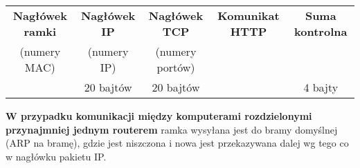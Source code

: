 \documentclass[../main.tex]{subfiles}
\begin{document}
\begin{adjustbox}{width=\columnwidth,center}
    \begin{tabular}{|c|c|c|c|c|}
        \hline
        \textbf{Nagłówek ramki }& \textbf{Nagłówek IP }& \textbf{Nagłówek TCP }& \textbf{Komunikat HTTP }& \textbf{Suma kontrolna}\\
        (numery MAC) & (numery IP) & (numery portów) & & \\
        & 20 bajtów & 20 bajtów & & 4 bajty\\
        \hline
    \end{tabular}
\end{adjustbox}

    \textbf{W przypadku komunikacji między komputerami rozdzielonymi przynajmniej jednym routerem} ramka wysyłana jest do bramy domyślnej (ARP na bramę), gdzie jest niszczona
    i nowa jest przekazywana dalej wg tego co w nagłówku pakietu IP.
\end{document}
